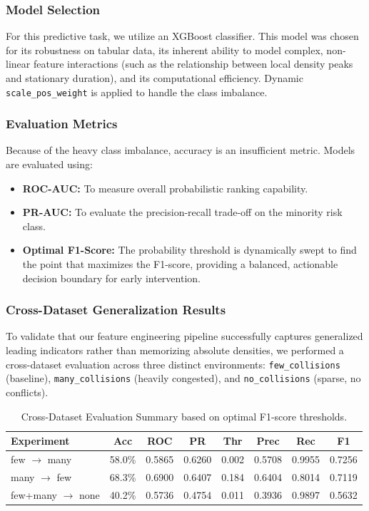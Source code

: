 \documentclass[12pt]{article}
\begin{document}
\subsubsection{Model Selection}
For this predictive task, we utilize an XGBoost classifier. This model was chosen for its robustness on tabular data, its inherent ability to model complex, non-linear feature interactions (such as the relationship between local density peaks and stationary duration), and its computational efficiency. Dynamic \texttt{scale\_pos\_weight} is applied to handle the class imbalance.

\subsubsection{Evaluation Metrics}
Because of the heavy class imbalance, accuracy is an insufficient metric. Models are evaluated using:
\begin{itemize}
    \item \textbf{ROC-AUC:} To measure overall probabilistic ranking capability.
    \item \textbf{PR-AUC:} To evaluate the precision-recall trade-off on the minority risk class.
    \item \textbf{Optimal F1-Score:} The probability threshold is dynamically swept to find the point that maximizes the F1-score, providing a balanced, actionable decision boundary for early intervention.
\end{itemize}

\subsubsection{Cross-Dataset Generalization Results}
To validate that our feature engineering pipeline successfully captures generalized leading indicators rather than memorizing absolute densities, we performed a cross-dataset evaluation across three distinct environments: \texttt{few\_collisions} (baseline), \texttt{many\_collisions} (heavily congested), and \texttt{no\_collisions} (sparse, no conflicts).

\begin{table}[htbp]
\centering
\begin{tabular}{lccccccc}
\hline
\textbf{Experiment} & \textbf{Acc} & \textbf{ROC} & \textbf{PR} & \textbf{Thr} & \textbf{Prec} & \textbf{Rec} & \textbf{F1} \\
\hline
few $\rightarrow$ many & 58.0\% & 0.5865 & 0.6260 & 0.002 & 0.5708 & 0.9955 & 0.7256 \\
many $\rightarrow$ few & 68.3\% & 0.6900 & 0.6407 & 0.184 & 0.6404 & 0.8014 & 0.7119 \\
few+many $\rightarrow$ none & 40.2\% & 0.5736 & 0.4754 & 0.011 & 0.3936 & 0.9897 & 0.5632 \\
\hline
\end{tabular}
\caption{Cross-Dataset Evaluation Summary based on optimal F1-score thresholds.}
\end{table}
\end{document}
